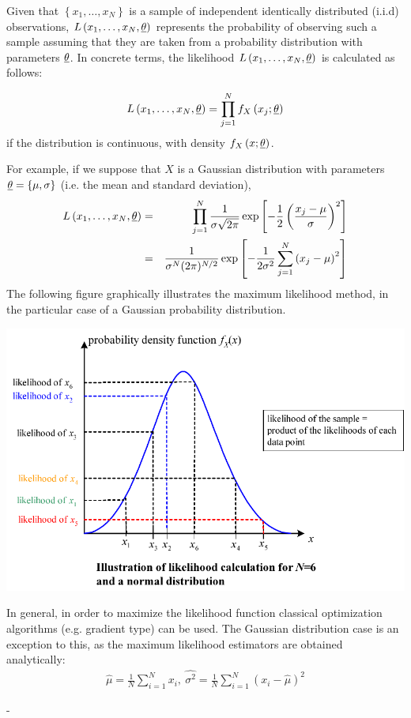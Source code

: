 {  Given that $\left\{x_1,\ldots,x_N \right\}$ is a sample of independent identically distributed (i.i.d) observations, $L\left(x_1,\ldots, x_N, {\underline{\theta}} \right)$ represents the probability of  observing such a sample assuming that they are taken from a probability distribution with parameters ${\underline{\theta}}$. In concrete terms, the likelihood $L\left(x_1,\ldots, x_N, {\underline{\theta}}\right)$ is calculated as follows:

  \begin{displaymath}
    L\left(x_1,\ldots, x_N, {\underline{\theta}} \right) = \prod_{j=1}^{N} f_X\left(x_j;{\underline{\theta}} \right)
  \end{displaymath}
  if the distribution is continuous, with density $f_X\left(x;{\underline{\theta}}\right)$.

  For example, if we suppose that $X$ is a Gaussian distribution with parameters ${\underline{\theta}}= \{ \mu,\sigma \}$  (i.e. the mean and standard deviation),
  \begin{eqnarray*}
    L\left(x_1,\ldots, x_N, {\underline{\theta}}\right) &=& \prod_{j=1}^{N} \frac{1}{\sigma \sqrt{2\pi}} \exp \left[ -\frac{1}{2} \left( \frac{x_j-\mu}{\sigma}  \right)^2  \right] \\
    &=& \frac{1}{\sigma^N (2\pi)^{N/2}} \exp \left[ -\frac{1}{2\sigma^2} \sum_{j=1}^N \left( x_j-\mu \right)^2  \right]
  \end{eqnarray*}
  The following figure graphically illustrates the maximum likelihood method, in the particular case of a Gaussian probability distribution.

  \begin{center}
    \includegraphics[scale=0.8]{Figures/MV.pdf}
  \end{center}

  In general, in order to maximize the likelihood function classical optimization algorithms (e.g. gradient type) can be used. The Gaussian distribution case is an exception to this, as the maximum likelihood estimators are obtained analytically:
  \begin{align*}
    \widehat{\mu}  = \frac{1}{N} \sum_{i=1}^N x_i,\ \widehat{\sigma^2} = \frac{1}{N} \sum_{i=1}^N \left( x_i - \widehat{\mu} \right)^2
  \end{align*}

}
{
  -
}


